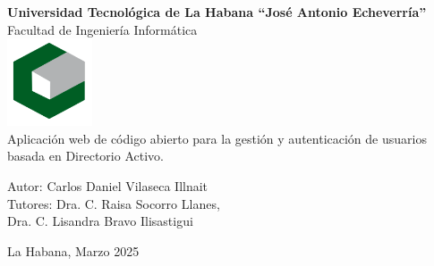 
\begin{titlepage}
    \centering
    {\fontsize{26pt}{30pt}\selectfont\bfseries Universidad Tecnológica de La Habana “José Antonio Echeverría”}\\
    \vspace{1cm}
    {\fontsize{15pt}{18pt}\selectfont Facultad de Ingeniería Informática}\\
    \vspace{1cm}
    \includegraphics{images/cujae.png}\\
    \vspace{1cm}
    {\fontsize{12pt}{14pt}\selectfont Aplicación web de código abierto para la gestión y autenticación de usuarios basada en Directorio Activo.}\\
    \vspace{2cm}
    \begin{flushleft}
        Autor: Carlos Daniel Vilaseca Illnait\\
        Tutores: Dra. C. Raisa Socorro Llanes,\\ 
        \hspace*{1.85cm}Dra. C. Lisandra Bravo Ilisastigui
    \end{flushleft}
    \vfill
    La Habana, Marzo 2025
\end{titlepage}

